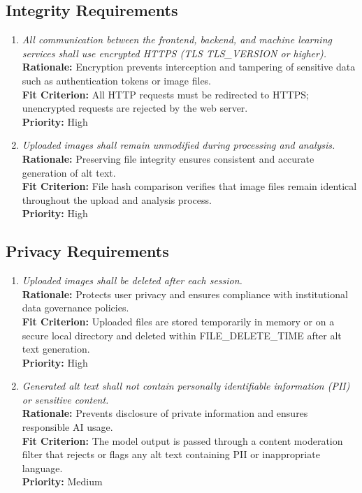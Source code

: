 \documentclass[12pt]{article}
\begin{document}
\subsection{Integrity Requirements}
\begin{enumerate}[label=SR-IR \arabic*., wide=0pt, leftmargin=*]
\item \emph{All communication between the frontend, backend, and machine learning services shall use encrypted HTTPS (TLS TLS\_VERSION or higher).}\\[2mm] 
    {\bf Rationale:} Encryption prevents interception and tampering of sensitive data such as authentication tokens or image files.\\
    {\bf Fit Criterion:} All HTTP requests must be redirected to HTTPS; unencrypted requests are rejected by the web server.\\
    {\bf Priority:} High

\item \emph{Uploaded images shall remain unmodified during processing and analysis.}\\[2mm] 
    {\bf Rationale:} Preserving file integrity ensures consistent and accurate generation of alt text.\\
    {\bf Fit Criterion:} File hash comparison verifies that image files remain identical throughout the upload and analysis process.\\
    {\bf Priority:} High
\end{enumerate}

\subsection{Privacy Requirements}
\begin{enumerate}[label=SR-PR \arabic*., wide=0pt, leftmargin=*]
\item \emph{Uploaded images shall be deleted after each session.}\\[2mm] 
    {\bf Rationale:} Protects user privacy and ensures compliance with institutional data governance policies.\\
    {\bf Fit Criterion:} Uploaded files are stored temporarily in memory or on a secure local directory and deleted within FILE\_DELETE\_TIME after alt text generation.\\
    {\bf Priority:} High

\item \emph{Generated alt text shall not contain personally identifiable information (PII) or sensitive content.}\\[2mm] 
    {\bf Rationale:} Prevents disclosure of private information and ensures responsible AI usage.\\
    {\bf Fit Criterion:} The model output is passed through a content moderation filter that rejects or flags any alt text containing PII or inappropriate language.\\
    {\bf Priority:} Medium
\end{enumerate}
\end{document}
